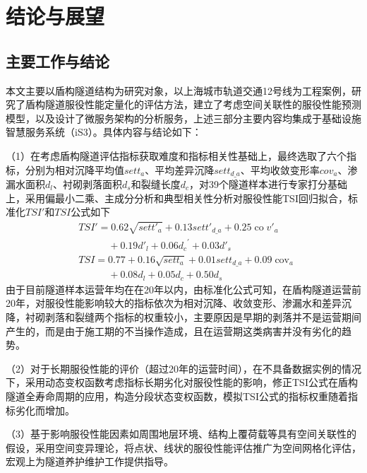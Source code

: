 \chapter{结论与展望}

\section{主要工作与结论}

本文主要以盾构隧道结构为研究对象，以上海城市轨道交通12号线为工程案例，研究了盾构隧道服役性能定量化的评估方法，建立了考虑空间关联性的服役性能预测模型，以及设计了微服务架构的分析服务，上述三部分主要内容均集成于基础设施智慧服务系统（iS3）。具体内容与结论如下：

（1）在考虑盾构隧道评估指标获取难度和指标相关性基础上，最终选取了六个指标，分别为相对沉降平均值${sett}_{a}$、平均差异沉降$set{{t}_{d\_a}}$、平均收敛变形率${cov}_{a}$、渗漏水面积${d}_{l}$、衬砌剥落面积${d}_{s}$和裂缝长度${d}_{c}$，对39个隧道样本进行专家打分基础上，采用偏最小二乘、主成分分析和典型相关性分析对服役性能TSI回归拟合，标准化$TSI'$和$TSI$公式如下
\begin{align}
  & TS{I}'=0.62\sqrt{set{{{{t}'}}_{a}}}+0.13set{{{{t}'}}_{d\_a}}+0.25\operatorname{co}{{{{v}'}}_{a}} \nonumber \\ 
 & \quad \quad \quad +0.19{{{{d}'}}_{l}}+0.06{{d}_{c}}^{\prime }+0.03{{{{d}'}}_{s}} \nonumber \\
  & TSI=0.77+0.16\sqrt{set{{t}_{a}}}+0.01set{{t}_{d\_a}}+0.09{{\operatorname{cov}}_{a}} \nonumber \\ 
 & \quad \quad \quad +0.08{{d}_{l}}+0.05{{d}_{c}}+0.50{{d}_{s}} \nonumber 
\end{align}
由于目前隧道样本运营年均在在20年以内，由标准化公式可知，在盾构隧道运营前20年，对服役性能影响较大的指标依次为相对沉降、收敛变形、渗漏水和差异沉降，衬砌剥落和裂缝两个指标的权重较小，主要原因是早期的剥落并不是运营期间产生的，而是由于施工期的不当操作造成，且在运营期这类病害并没有劣化的趋势。

（2）对于长期服役性能的评价（超过20年的运营时间），在不具备数据实例的情况下，采用动态变权函数考虑指标长期劣化对服役性能的影响，修正TSI公式在盾构隧道全寿命周期的应用，构造分段状态变权函数，模拟TSI公式的指标权重随着指标劣化而增加。

（3）基于影响服役性能因素如周围地层环境、结构上覆荷载等具有空间关联性的假设，采用空间变异理论，将点状、线状的服役性能评估推广为空间网格化评估，宏观上为隧道养护维护工作提供指导。


